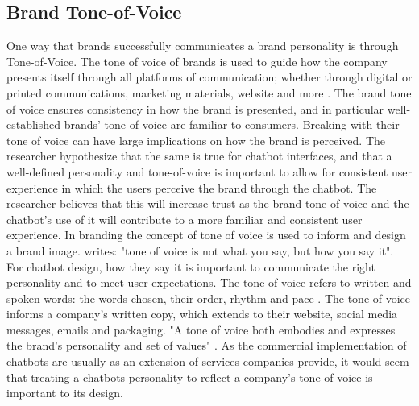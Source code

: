 \vspace{2,5mm}

\subsection{Brand Tone-of-Voice}

One way that brands successfully communicates a brand personality is through Tone-of-Voice. The tone of voice of brands is used to guide how the company presents itself through all platforms of communication; whether through digital or printed communications, marketing materials, website and more \citep{cummings2017}. The brand tone of voice ensures consistency in how the brand is presented, and in particular well-established brands' tone of voice are familiar to consumers. Breaking with their tone of voice can have large implications on how the brand is perceived. The researcher hypothesize that the same is true for chatbot interfaces, and that a well-defined personality and tone-of-voice is important to allow for consistent user experience in which the users perceive the brand through the chatbot. The researcher believes that this will increase trust as the brand tone of voice and the chatbot's use of it will contribute to a more familiar and consistent user experience. In branding the concept of tone of voice is used to inform and design a brand image. \cite{cummings2017} writes: "tone of voice is not what you say, but how you say it". For chatbot design, how they say it is important to communicate the right personality and to meet user expectations. The tone of voice refers to written and spoken words: the words chosen, their order, rhythm and pace \citep{cummings2017}. The tone of voice informs a company's written copy, which extends to their website, social media messages, emails and packaging. "A tone of voice both embodies and expresses the brand's personality and set of values" \citep{cummings2017}. As the commercial implementation of chatbots are usually as an extension of services companies provide, it would seem that treating a chatbots personality to reflect a company's tone of voice is important to its design. 

